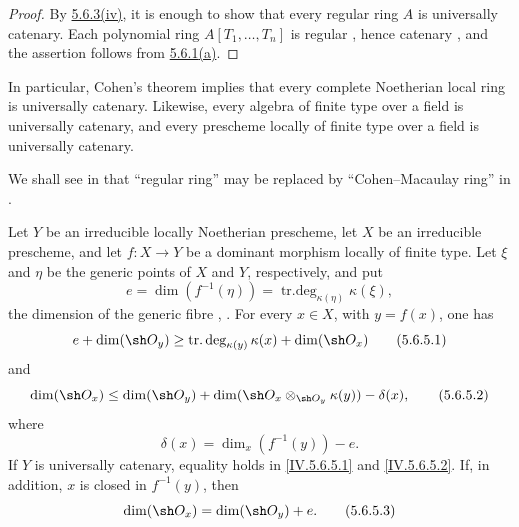 \begin{proof}
By \hyperref[IV.5.6.3.iv]{5.6.3\textup{(iv)}}, it is enough to show
that every regular ring
$A$ is universally catenary.  Each polynomial ring
$A[T_1,\ldots,T_n]$ is regular , hence catenary
, and the assertion follows from
\hyperref[IV.5.6.1.a]{5.6.1\textup{(a)}}.
\end{proof}

In particular, Cohen's theorem  implies that every
complete Noetherian local ring is universally catenary.  Likewise,
every algebra of finite type over a field is universally catenary,
and every prescheme locally of finite type over a field is
universally catenary.

We shall see in  that ``regular ring'' may be replaced
by ``Cohen--Macaulay ring'' in .

\begin{proposition}[5.6.5]
\label{IV.5.6.5}
Let $Y$ be an irreducible locally Noetherian prescheme, let $X$ be
an irreducible prescheme, and let $f:X\to Y$ be a dominant morphism
locally of finite type.  Let $\xi$ and $\eta$ be the generic points
of $X$ and $Y$, respectively, and put
\[
e=\dim(f^{-1}(\eta))
  =\operatorname{tr.deg}_{\kappa(\eta)}\kappa(\xi),
\]
the dimension of the generic fibre
, .
For every $x\in X$, with $y=f(x)$, one has
\begin{equation}
e+\dim(\sh O_y)
 \geq \operatorname{tr.deg}_{\kappa(y)}\kappa(x)
       +\dim(\sh O_x)
\tag{5.6.5.1}\label{IV.5.6.5.1}
\end{equation}
and
\begin{equation}
\dim(\sh O_x)
 \leq \dim(\sh O_y)
      +\dim(\sh O_x\otimes_{\sh O_y}\kappa(y))
      -\delta(x),
\tag{5.6.5.2}\label{IV.5.6.5.2}
\end{equation}
where
\[
\delta(x)=\dim_x(f^{-1}(y))-e.
\]
If $Y$ is universally catenary, equality holds in
\eqref{IV.5.6.5.1} and \eqref{IV.5.6.5.2}.  If, in addition, $x$ is
closed in $f^{-1}(y)$, then
\begin{equation}
\dim(\sh O_x)=\dim(\sh O_y)+e.
\tag{5.6.5.3}\label{IV.5.6.5.3}
\end{equation}
\end{proposition}

